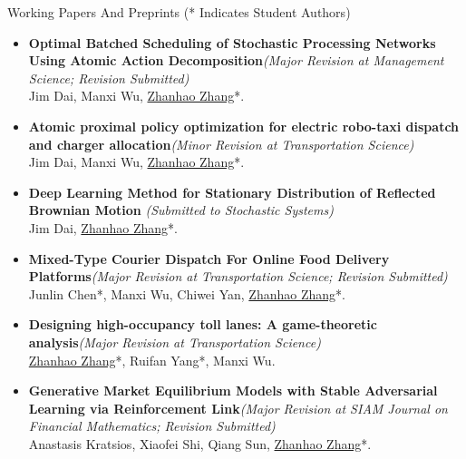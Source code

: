 \documentclass{resume} %
\begin{document}
\begin{rSection}{Working Papers And Preprints ({* Indicates Student Authors})}
\begin{itemize}
\item {\bf Optimal Batched Scheduling of Stochastic Processing Networks Using Atomic Action Decomposition}\hfill {\em (Major Revision at Management Science; Revision Submitted)}\\
Jim Dai, Manxi Wu, \underline{Zhanhao Zhang}*.
\item {\bf Atomic proximal policy optimization for electric robo-taxi dispatch and charger allocation}\hfill {\em (Minor Revision at Transportation Science)}\\
Jim Dai, Manxi Wu, \underline{Zhanhao Zhang}*.
\item {\bf Deep Learning Method for Stationary Distribution of Reflected Brownian Motion} \hfill {\em (Submitted to Stochastic Systems)}\\
Jim Dai, \underline{Zhanhao Zhang}*.
\item {\bf Mixed-Type Courier Dispatch For Online Food Delivery Platforms}\hfill {\em (Major Revision at Transportation Science; Revision Submitted)}\\
Junlin Chen*, Manxi Wu, Chiwei Yan, \underline{Zhanhao Zhang}*.
\item {\bf Designing high-occupancy toll lanes: A game-theoretic analysis}\hfill {\em (Major Revision at Transportation Science)}\\
\underline{Zhanhao Zhang}*, Ruifan Yang*, Manxi Wu.
\item {\bf Generative Market Equilibrium Models with Stable Adversarial Learning via Reinforcement Link}\hfill {\em (Major Revision at SIAM Journal on Financial Mathematics; Revision Submitted)}\\
Anastasis Kratsios, Xiaofei Shi, Qiang Sun, \underline{Zhanhao Zhang}*.
\end{itemize}
\end{rSection}
\end{document}

